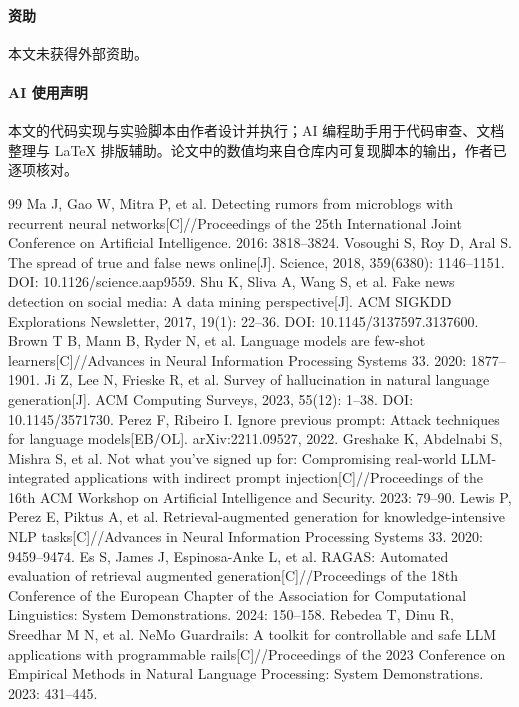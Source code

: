 \documentclass[12pt,a4paper,fontset=windows]{ctexart}
\begin{document}
\paragraph{资助}
本文未获得外部资助。

\paragraph{AI 使用声明}
本文的代码实现与实验脚本由作者设计并执行；AI 编程助手用于代码审查、文档整理与 \LaTeX{} 排版辅助。论文中的数值均来自仓库内可复现脚本的输出，作者已逐项核对。

\begin{thebibliography}{99}
 Ma J, Gao W, Mitra P, et al. Detecting rumors from microblogs with recurrent neural networks[C]//Proceedings of the 25th International Joint Conference on Artificial Intelligence. 2016: 3818--3824.
 Vosoughi S, Roy D, Aral S. The spread of true and false news online[J]. Science, 2018, 359(6380): 1146--1151. DOI: 10.1126/science.aap9559.
 Shu K, Sliva A, Wang S, et al. Fake news detection on social media: A data mining perspective[J]. ACM SIGKDD Explorations Newsletter, 2017, 19(1): 22--36. DOI: 10.1145/3137597.3137600.
 Brown T B, Mann B, Ryder N, et al. Language models are few-shot learners[C]//Advances in Neural Information Processing Systems 33. 2020: 1877--1901.
 Ji Z, Lee N, Frieske R, et al. Survey of hallucination in natural language generation[J]. ACM Computing Surveys, 2023, 55(12): 1--38. DOI: 10.1145/3571730.
 Perez F, Ribeiro I. Ignore previous prompt: Attack techniques for language models[EB/OL]. arXiv:2211.09527, 2022.
 Greshake K, Abdelnabi S, Mishra S, et al. Not what you've signed up for: Compromising real-world LLM-integrated applications with indirect prompt injection[C]//Proceedings of the 16th ACM Workshop on Artificial Intelligence and Security. 2023: 79--90.
 Lewis P, Perez E, Piktus A, et al. Retrieval-augmented generation for knowledge-intensive NLP tasks[C]//Advances in Neural Information Processing Systems 33. 2020: 9459--9474.
 Es S, James J, Espinosa-Anke L, et al. RAGAS: Automated evaluation of retrieval augmented generation[C]//Proceedings of the 18th Conference of the European Chapter of the Association for Computational Linguistics: System Demonstrations. 2024: 150--158.
 Rebedea T, Dinu R, Sreedhar M N, et al. NeMo Guardrails: A toolkit for controllable and safe LLM applications with programmable rails[C]//Proceedings of the 2023 Conference on Empirical Methods in Natural Language Processing: System Demonstrations. 2023: 431--445.

\end{thebibliography}
\end{document}
